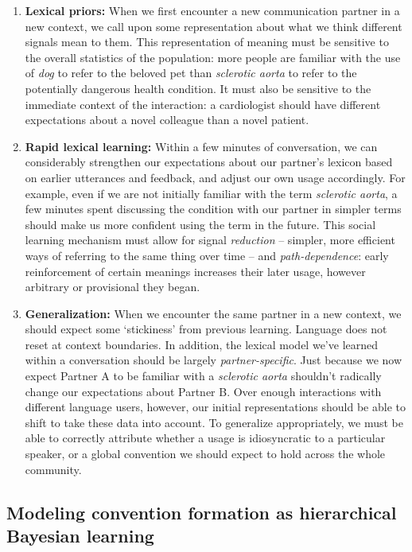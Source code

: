 \documentclass[11pt, floatsintext, jou]{apa6}
\begin{document}
\begin{enumerate}
\item \textbf{Lexical priors:} When we first encounter a new communication partner in a new context, we call upon some representation about what we think different signals mean to them. This representation of meaning must be sensitive to the overall statistics of the population: more people are familiar with the use of \emph{dog} to refer to the beloved pet than \emph{sclerotic aorta} to refer to the potentially dangerous health condition. It must also be sensitive to the immediate context of the interaction: a cardiologist should have different expectations about a novel colleague than a novel patient.
\item \textbf{Rapid lexical learning:} Within a few minutes of conversation, we can considerably strengthen our expectations about our partner's lexicon based on earlier utterances and feedback, and adjust our own usage accordingly. For example, even if we are not initially familiar with the term \emph{sclerotic aorta}, a few minutes spent discussing the condition with our partner in simpler terms should make us more confident using the term in the future. This social learning mechanism must allow for signal \emph{reduction} -- simpler, more efficient ways of referring to the same thing over time -- and \emph{path-dependence}: early reinforcement of certain meanings increases their later usage, however arbitrary or provisional they began. 
\item \textbf{Generalization:} When we encounter the same partner in a new context, we should expect some `stickiness' from previous learning. Language does not reset at context boundaries. In addition, the lexical model we've learned within a conversation should be largely \emph{partner-specific}. Just because we now expect Partner A to be familiar with a \emph{sclerotic aorta} shouldn't radically change our expectations about Partner B. Over enough interactions with different language users, however, our initial representations should be able to shift to take these data into account. To generalize appropriately, we must be able to correctly attribute whether a usage is idiosyncratic to a particular speaker, or a global convention we should expect to hold across the whole community.

\end{enumerate}

\subsection{Modeling convention formation as hierarchical Bayesian learning}
\end{document}
